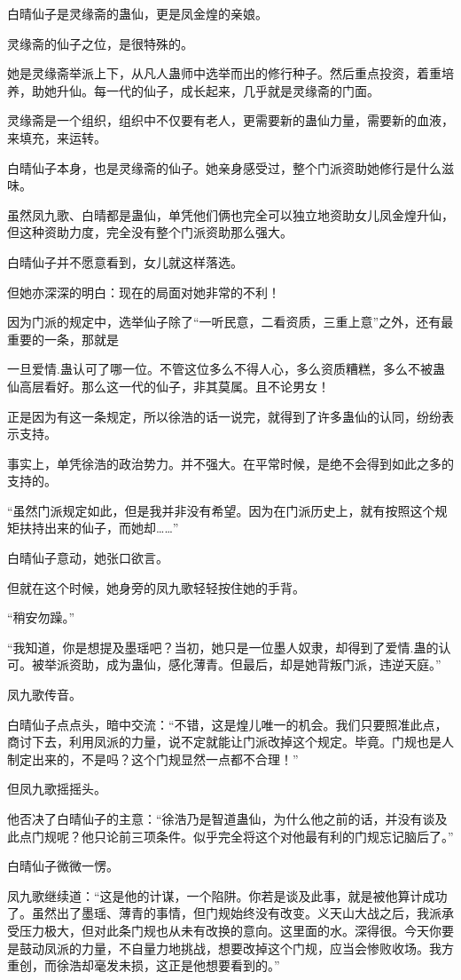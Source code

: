 \begin{this_body}
白晴仙子是灵缘斋的蛊仙，更是凤金煌的亲娘。

灵缘斋的仙子之位，是很特殊的。

她是灵缘斋举派上下，从凡人蛊师中选举而出的修行种子。然后重点投资，着重培养，助她升仙。每一代的仙子，成长起来，几乎就是灵缘斋的门面。

灵缘斋是一个组织，组织中不仅要有老人，更需要新的蛊仙力量，需要新的血液，来填充，来运转。

白晴仙子本身，也是灵缘斋的仙子。她亲身感受过，整个门派资助她修行是什么滋味。

虽然凤九歌、白晴都是蛊仙，单凭他们俩也完全可以独立地资助女儿凤金煌升仙，但这种资助力度，完全没有整个门派资助那么强大。

白晴仙子并不愿意看到，女儿就这样落选。

但她亦深深的明白：现在的局面对她非常的不利！

因为门派的规定中，选举仙子除了“一听民意，二看资质，三重上意”之外，还有最重要的一条，那就是

一旦爱情.蛊认可了哪一位。不管这位多么不得人心，多么资质糟糕，多么不被蛊仙高层看好。那么这一代的仙子，非其莫属。且不论男女！

正是因为有这一条规定，所以徐浩的话一说完，就得到了许多蛊仙的认同，纷纷表示支持。

事实上，单凭徐浩的政治势力。并不强大。在平常时候，是绝不会得到如此之多的支持的。

“虽然门派规定如此，但是我并非没有希望。因为在门派历史上，就有按照这个规矩扶持出来的仙子，而她却……”

白晴仙子意动，她张口欲言。

但就在这个时候，她身旁的凤九歌轻轻按住她的手背。

“稍安勿躁。”

“我知道，你是想提及墨瑶吧？当初，她只是一位墨人奴隶，却得到了爱情.蛊的认可。被举派资助，成为蛊仙，感化薄青。但最后，却是她背叛门派，违逆天庭。”

凤九歌传音。

白晴仙子点点头，暗中交流：“不错，这是煌儿唯一的机会。我们只要照准此点，商讨下去，利用凤派的力量，说不定就能让门派改掉这个规定。毕竟。门规也是人制定出来的，不是吗？这个门规显然一点都不合理！”

但凤九歌摇摇头。

他否决了白晴仙子的主意：“徐浩乃是智道蛊仙，为什么他之前的话，并没有谈及此点门规呢？他只论前三项条件。似乎完全将这个对他最有利的门规忘记脑后了。”

白晴仙子微微一愣。

凤九歌继续道：“这是他的计谋，一个陷阱。你若是谈及此事，就是被他算计成功了。虽然出了墨瑶、薄青的事情，但门规始终没有改变。义天山大战之后，我派承受压力极大，但对此条门规也从未有改换的意向。这里面的水。深得很。今天你要是鼓动凤派的力量，不自量力地挑战，想要改掉这个门规，应当会惨败收场。我方重创，而徐浩却毫发未损，这正是他想要看到的。”


\end{this_body}
